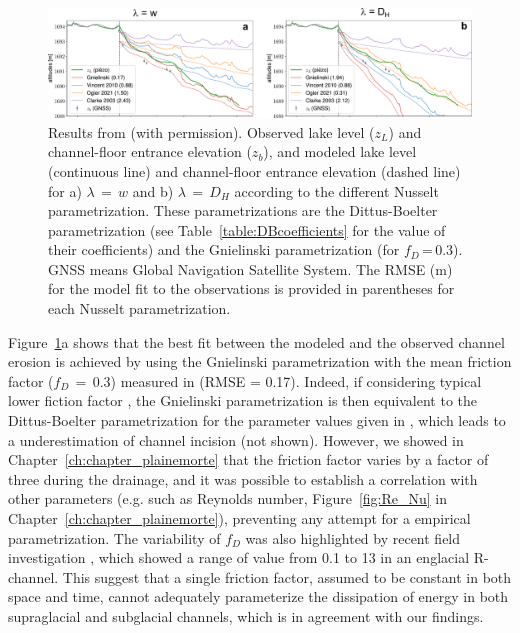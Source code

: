 \begin{figure}[h]
    \centering
    \includegraphics[width=1\textwidth]{chapters/Discussion/Bossons_models.pdf}
    \caption{Results from \cite{Gagliardini&al2024} (with permission). Observed lake level ($z_L$) and channel-floor entrance elevation ($z_b$), and modeled lake level (continuous line) and channel-floor entrance elevation (dashed line) for a) $\lambda\,=\,w$ and b) $\lambda\,=\,D_H$ according to the different Nusselt parametrization. These parametrizations are the Dittus-Boelter parametrization (see Table~\ref{table:DBcoefficients} for the value of their coefficients) and the Gnielinski parametrization (for $f_D$\,=\,0.3). GNSS means Global Navigation Satellite System. The RMSE (m) for the model fit to the observations is provided in parentheses for each Nusselt parametrization.}
    \label{fig:gag_nusselt}
\end{figure}


Figure~\ref{fig:gag_nusselt}a shows that the best fit between the modeled and the observed channel erosion is achieved by using the Gnielinski parametrization with the mean friction factor ($f_D\,=\,0.3$) measured in \cite{Ogier&al2021} (RMSE = 0.17). Indeed, if considering typical lower fiction factor \citep[e.g. $f_D$\,=\,0.01 to 0.03 in][]{Ancey&al2019}, the Gnielinski parametrization is then equivalent to the Dittus-Boelter parametrization for the parameter values given in \cite{Clarke2003}, which leads to a underestimation of channel incision (not shown). However, we showed in Chapter~\ref{ch:chapter_plainemorte} that the friction factor varies by a factor of three during the drainage, and it was possible to establish a correlation with other parameters (e.g. such as Reynolds number, Figure~\ref{fig:Re_Nu} in Chapter~\ref{ch:chapter_plainemorte}), preventing any attempt for a empirical parametrization. The variability of $f_D$ was also highlighted by recent field investigation \citep{pohle&&2022}, which showed a range of value from 0.1 to 13 in an englacial R-channel. This suggest that a single friction factor, assumed to be constant in both space and time, cannot adequately parameterize the dissipation of energy in both supraglacial and subglacial channels, which is in agreement with our findings.

